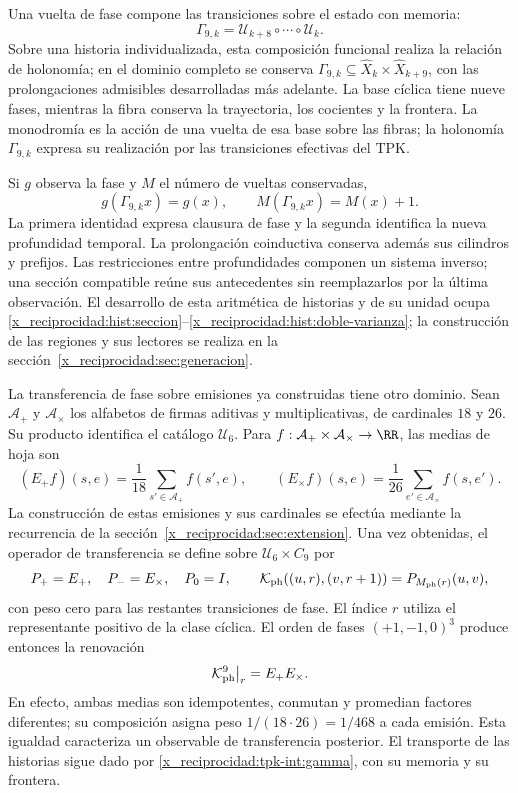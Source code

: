 Una vuelta de fase compone las transiciones sobre el estado con memoria:
\begin{equation}
 \Gamma_{9,k}=\mathcal U_{k+8}\circ\cdots\circ\mathcal U_k.
 \label{x_reciprocidad:tpk-int:gamma}
\end{equation}
Sobre una historia individualizada, esta composición funcional realiza
la relación de holonomía; en el dominio completo se conserva
\(\Gamma_{9,k}\subseteq\widehat X_k\times\widehat X_{k+9}\),
con las prolongaciones admisibles desarrolladas más adelante.
La base cíclica tiene nueve fases, mientras
la fibra conserva la trayectoria, los cocientes y la frontera. La
monodromía es la acción de una vuelta de esa base sobre las fibras; la
holonomía \(\Gamma_{9,k}\) expresa su realización por las transiciones
efectivas del TPK.

Si \(g\) observa la fase y \(M\) el número de vueltas conservadas,
\[
 g(\Gamma_{9,k}x)=g(x),\qquad M(\Gamma_{9,k}x)=M(x)+1.
\]
La primera identidad expresa clausura de fase y la segunda identifica
la nueva profundidad temporal. La prolongación coinductiva conserva
además sus cilindros y prefijos. Las restricciones entre profundidades
componen un sistema inverso; una sección compatible reúne sus
antecedentes sin reemplazarlos por la última observación. El desarrollo
de esta aritmética de historias y de su unidad ocupa
\ref{x_reciprocidad:hist:seccion}--\ref{x_reciprocidad:hist:doble-varianza}; la construcción de las
regiones y sus lectores se realiza en la sección~\ref{x_reciprocidad:sec:generacion}.

La transferencia de fase sobre emisiones ya construidas tiene otro
dominio. Sean \(\mathcal A_+\) y \(\mathcal A_\times\) los
alfabetos de firmas aditivas y multiplicativas, de cardinales \(18\)
y \(26\). Su producto identifica el catálogo \(\mathcal U_6\).
Para \(f:\mathcal A_+\times\mathcal A_\times\to\RR\),
las medias de hoja son
\[
 (E_+f)(s,e)=\frac1{18}\sum_{s'\in\mathcal A_+}f(s',e),\qquad
 (E_\times f)(s,e)=\frac1{26}\sum_{e'\in\mathcal A_\times}f(s,e').
\]
La construcción de estas emisiones y sus cardinales se efectúa mediante
la recurrencia de la sección~\ref{x_reciprocidad:sec:extension}. Una vez obtenidas,
el operador de transferencia se define sobre
\(\mathcal U_6\times C_9\) por
\[
 P_+=E_+,\quad P_-=E_\times,\quad P_0=I,\qquad
 \mathcal K_{\rm ph}((u,r),(v,r+1))=P_{M_{\rm ph}(r)}(u,v),
\]
con peso cero para las restantes transiciones de fase. El índice
\(r\) utiliza el representante positivo de la clase cíclica.
El orden de fases \((+1,-1,0)^3\) produce entonces la renovación
\[
 \mathcal K_{\rm ph}^{9}\big|_r=E_+E_\times.
\]
En efecto, ambas medias son idempotentes, conmutan y promedian factores
diferentes; su composición asigna peso \(1/(18\cdot26)=1/468\)
a cada emisión. Esta igualdad caracteriza un observable de transferencia
posterior. El transporte de las historias sigue dado por
\eqref{x_reciprocidad:tpk-int:gamma}, con su memoria y su frontera.

